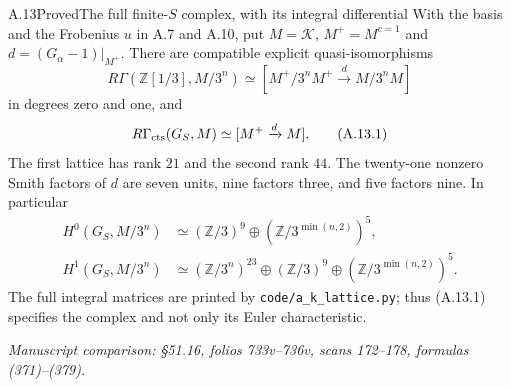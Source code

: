 \begin{statement}{A.13}{Proved}{The full finite-$S$ complex, with its integral differential}
With the basis and the Frobenius $u$ in A.7 and A.10, put
$M=\mathcal K$, $M^+=M^{c=1}$ and $d=(G_\alpha-1)|_{M^+}$.
There are compatible explicit quasi-isomorphisms
\[
 R\Gamma(\mathbb Z[1/3],M/3^n)
       \simeq[M^+/3^nM^+\xrightarrow{d}M/3^nM]
\]
in degrees zero and one, and
\[
 R\Gamma_{\rm cts}(G_S,M)\simeq[M^+\xrightarrow d M].
 \tag{A.13.1}
\]
The first lattice has rank $21$ and the second rank $44$.
The twenty-one nonzero Smith factors of $d$ are seven units,
nine factors three, and five factors nine. In particular
\[
\begin{aligned}
 H^0(G_S,M/3^n)&\simeq(\mathbb Z/3)^9
                    \oplus(\mathbb Z/3^{\min(n,2)})^5,\\
 H^1(G_S,M/3^n)&\simeq(\mathbb Z/3^n)^{23}
                    \oplus(\mathbb Z/3)^9
                    \oplus(\mathbb Z/3^{\min(n,2)})^5.
\end{aligned}
\tag{A.13.2}
\]
The full integral matrices are printed by
\texttt{code/a\_k\_lattice.py}; thus (A.13.1) specifies the complex
and not only its Euler characteristic.
\par\smallskip\noindent\emph{Manuscript comparison: \S51.16,
folios 733v--736v, scans 172--178, formulas (371)--(379).}
\end{statement}

